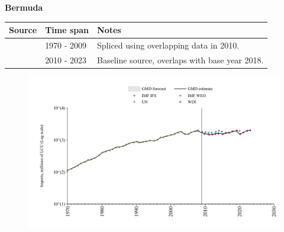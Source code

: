 \documentclass[12pt,a4paper,landscape]{article}
\begin{document}
\begin{adjustbox}{max totalsize={\paperwidth}{\paperheight},center}
\begin{minipage}[t][\textheight][t]{\textwidth}
\vspace*{0.5cm}
{}
\begin{center}
{\Large\bfseries Bermuda}
\end{center}
\vspace{0.5cm}
\begin{table}[H]
\centering
\small
\begin{tabular}{|l|l|l|}
\hline
\textbf{Source} & \textbf{Time span} & \textbf{Notes} \\
\hline
\rowcolor{white}\cite{UN}& 1970 - 2009 &Spliced using overlapping data in 2010.\\
\rowcolor{lightgray}\cite{WDI}& 2010 - 2023 &Baseline source, overlaps with base year 2018.\\
\hline
\end{tabular}
\end{table}
\begin{figure}[H]
\centering
\includegraphics[width=\textwidth,height=0.6\textheight,keepaspectratio]{graphs/BMU_imports.pdf}
\end{figure}
\end{minipage}
\end{adjustbox}
\end{document}
